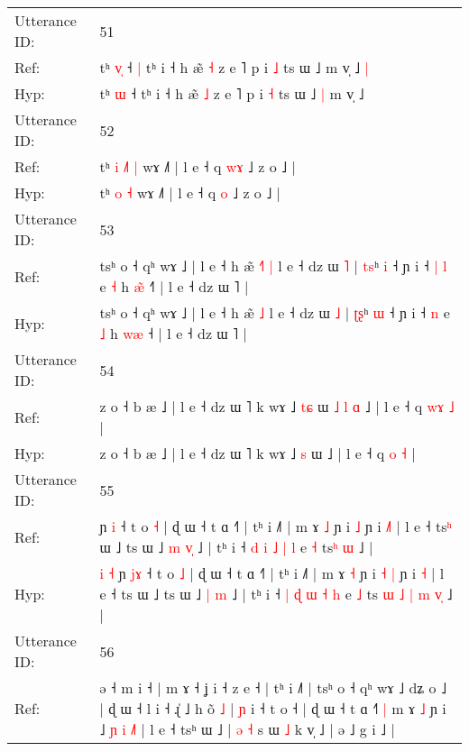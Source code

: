 \documentclass[10pt]{article}
\DeclareRobustCommand{\hl}[1]{{\textcolor{red}{#1}}}
\begin{document}
\begin{longtable}{ll}
 \\
\midrule
Utterance ID: & 51 \\
Ref: & tʰ \hl{v}\hl{̩} ˧\hl{ }\hl{|} tʰ i ˧ h æ̃ \hl{˧} z e ˥ p i \hl{˩} ts ɯ ˩\hl{}\hl{} m v̩ ˩\hl{ }\hl{|}
 \\
Hyp: & tʰ \hl{}\hl{ɯ} ˧\hl{}\hl{} tʰ i ˧ h æ̃ \hl{˩} z e ˥ p i \hl{˧} ts ɯ ˩\hl{ }\hl{|} m v̩ ˩\hl{}\hl{}
 \\
\midrule
Utterance ID: & 52 \\
Ref: & tʰ\hl{ }\hl{i} \hl{˩}\hl{˥} \hl{|} wɤ ˩˥ | l e ˧ q \hl{w}\hl{ɤ} ˩ z o ˩ |
 \\
Hyp: & tʰ\hl{}\hl{} \hl{}\hl{o} \hl{˧} wɤ ˩˥ | l e ˧ q \hl{}\hl{o} ˩ z o ˩ |
 \\
\midrule
Utterance ID: & 53 \\
Ref: & tsʰ o ˧ qʰ wɤ ˩ | l e ˧ h æ̃\hl{ }\hl{˧}\hl{˥} \hl{|} l e ˧ dz ɯ \hl{˥} | \hl{t}\hl{s}ʰ \hl{i} ˧ ɲ i ˧\hl{ }\hl{|} \hl{l} e \hl{˧} h \hl{æ}\hl{̃} ˧\hl{˥} | l e ˧ dz ɯ ˥ |
 \\
Hyp: & tsʰ o ˧ qʰ wɤ ˩ | l e ˧ h æ̃\hl{}\hl{}\hl{} \hl{˩} l e ˧ dz ɯ \hl{˩} | \hl{ʈ}\hl{ʂ}ʰ \hl{ɯ} ˧ ɲ i ˧\hl{}\hl{} \hl{n} e \hl{˩} h \hl{w}\hl{æ} ˧\hl{} | l e ˧ dz ɯ ˥ |
 \\
\midrule
Utterance ID: & 54 \\
Ref: & z o ˧ b æ ˩ | l e ˧ dz ɯ ˥ k wɤ ˩ \hl{t}\hl{ɕ} ɯ\hl{ }\hl{˩}\hl{ }\hl{l}\hl{ }\hl{ɑ} ˩ | l e ˧ q \hl{w}\hl{ɤ} \hl{˩} |
 \\
Hyp: & z o ˧ b æ ˩ | l e ˧ dz ɯ ˥ k wɤ ˩ \hl{}\hl{s} ɯ\hl{}\hl{}\hl{}\hl{}\hl{}\hl{} ˩ | l e ˧ q \hl{}\hl{o} \hl{˧} |
 \\
\midrule
Utterance ID: & 55 \\
Ref: & \hl{}\hl{}\hl{}\hl{}ɲ \hl{}\hl{i} ˧ t o \hl{˧} | ɖ ɯ ˧ t ɑ ˧˥ | tʰ i ˩˥ | m ɤ \hl{˩} ɲ i\hl{}\hl{} \hl{˩} ɲ i \hl{˩}\hl{˥} | l e ˧ ts\hl{ʰ} ɯ ˩ ts ɯ ˩ \hl{m} \hl{v}\hl{̩} ˩ | tʰ i ˧ \hl{d} \hl{i} \hl{˩} \hl{|} \hl{l} e \hl{˧} ts\hl{}\hl{}\hl{}\hl{}\hl{}\hl{}\hl{}\hl{ʰ} \hl{}\hl{ɯ} ˩ |
 \\
Hyp: & \hl{i}\hl{ }\hl{˧}\hl{ }ɲ \hl{j}\hl{ɤ} ˧ t o \hl{˩} | ɖ ɯ ˧ t ɑ ˧˥ | tʰ i ˩˥ | m ɤ \hl{˧} ɲ i\hl{ }\hl{˧} \hl{|} ɲ i \hl{}\hl{˧} | l e ˧ ts\hl{} ɯ ˩ ts ɯ ˩ \hl{|} \hl{}\hl{m} ˩ | tʰ i ˧ \hl{|} \hl{ɖ} \hl{ɯ} \hl{˧} \hl{h} e \hl{˩} ts\hl{ }\hl{ɯ}\hl{ }\hl{˩}\hl{ }\hl{|}\hl{ }\hl{m} \hl{v}\hl{̩} ˩ |
 \\
\midrule
Utterance ID: & 56 \\
Ref: & ə ˧ m i ˧ | m ɤ ˧ ʝ i ˧ z e ˧ | tʰ i ˩˥ | tsʰ o ˧ qʰ wɤ ˩ dʑ o ˩ | ɖ ɯ ˧ l i ˧ ɻ̍ ˩ h õ \hl{˩} | \hl{ɲ} i ˧ t o ˧ | ɖ ɯ ˧ t ɑ ˧˥\hl{ }\hl{|} m ɤ \hl{˩} ɲ i ˩ \hl{ɲ} \hl{i} \hl{}\hl{}\hl{˩}\hl{˥} | l e ˧ tsʰ ɯ ˩ |\hl{}\hl{}\hl{}\hl{}\hl{} \hl{}\hl{ə} \hl{˧} s ɯ \hl{˩} k v̩ ˩ | ə ˩ g i ˩ |

\end{longtable}
\end{document}
